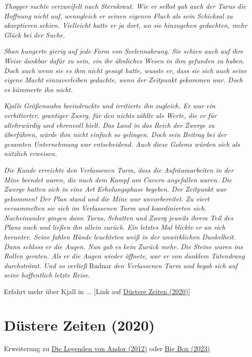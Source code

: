 \documentclass[10pt, a4paper, oneside]{book}
\newcommand{\fillbreak}{\vspace*{\fill}\columnbreak}
\newcommand{\produkt}[1]{%
    \section{#1}%
    \label{Produkt: #1}%
}
\newcommand{\refprodukt}[1]{\hyperref[Produkt: #1]{#1}}
\begin{document}
\begin{multicols}{2}
\textit{Thogger suchte verzweifelt nach Sternkraut. Wie er selbst gab auch der Tarus die Hoffnung nicht auf, wenngleich er seinen eigenen Fluch als sein Schicksal zu akzeptieren schien. Vielleicht hatte er ja dort, wo sie hinzugehen gedachten, mehr Glück bei der Suche.}\bigskip

\textit{Shan hungerte gierig auf jede Form von Seelennahrung. Sie schien auch auf ihre Weise dankbar dafür zu sein, ein ihr ähnliches Wesen in ihm gefunden zu haben. Doch auch wenn sie es ihm nicht gesagt hatte, wusste er, dass sie sich auch seine eigene Macht einzuverleiben gedachte, wenn der Zeitpunkt gekommen war. Doch es kümmerte ihn nicht.}\bigskip

\textit{Kjalls Größenwahn beeindruckte und irritierte ihn zugleich. Er war ein verbitterter, grantiger Zwerg, für den nichts zählte als Werte, die er für altehrwürdig und ehrenvoll hielt. Das Land in das Reich der Zwerge zu überführen, würde ihm nicht einfach so gelingen. Doch sein Beitrag bei der gesamten Unternehmung war entscheidend. Auch diese Golems würden sich als nützlich erweisen.}\bigskip

\textit{Die Kunde erreichte den Verlassenen Turm, dass die Aufräumarbeiten in der Mine beendet waren, die nach dem Kampf um Cavern angefallen waren. Die Zwerge hatten sich in eine Art Erholungsphase begeben. Der Zeitpunkt war gekommen! Der Plan stand und die Mine war unvorbereitet. Zu viert versammelten sie sich im Verlassenen Turm und koordinierten sich. Nacheinander gingen dann Tarus, Schatten und Zwerg jeweils ihrem Teil des Plans nach und ließen ihn allein zurück. Ein letztes Mal blickte er an sich herunter. Seine fahlen Hände leuchteten weiß in der unwirklichen Dunkelheit. Dann schloss er die Augen. Nun gab es kein Zurück mehr. Die Steine waren ins Rollen geraten. Als er die Augen wieder öffnete, war er von dunklem Tatendrang durchströmt. Und so verließ} Rudnar \textit{den Verlassenen Turm und begab sich auf seine hoffentlich letzte Reise.}\bigskip

Erfahrt mehr über Kjall in ... [Link auf \refprodukt{Düstere Zeiten (2020)}]






\fillbreak

\produkt{Düstere Zeiten (2020)}

\begin{center}
    Erweiterung zu \refprodukt{Die Legenden von Andor (2012)} oder \refprodukt{Big Box (2023)}
\end{center}


\end{multicols}
\end{document}
